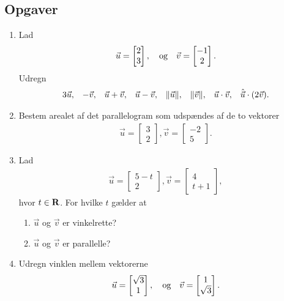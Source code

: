 \subsection{Opgaver}
\begin{enumerate}
	\item Lad 
	\begin{align*}
	\vec{u}=\begin{bmatrix}
	2\\3
	\end{bmatrix},\quad \textup{og}\quad \vec{v}=\begin{bmatrix}
	-1\\2
	\end{bmatrix}.
	\end{align*}
	Udregn
	\begin{align*}
	3\vec{u},&&-\vec{v},&&\vec{u}+\vec{v},&&\vec{u}-\vec{v},&&\Vert \vec{u}\Vert,&&\Vert \vec{v}\Vert,&&\vec{u}\cdot \vec{v},&& \hat{\vec{u}}\cdot (2\vec{v}).
	\end{align*}
	
	\item Bestem arealet af det parallelogram som udspændes af de to vektorer
	\begin{align*}
	\vec{u}=\begin{bmatrix}
	3\\2
	\end{bmatrix},
	\vec{v}=\begin{bmatrix}
	-2\\5
	\end{bmatrix}.
	\end{align*}
	
	\item Lad 
	\begin{align*}
	\vec{u}=\begin{bmatrix}
	5-t\\ 2
	\end{bmatrix},
	\vec{v}=\begin{bmatrix}
	4\\t+1
	\end{bmatrix},
	\end{align*}
	hvor $t\in \mathbf{R}$. For hvilke $t$ gælder at
	\begin{enumerate}
		\item $\vec{u}$ og $\vec{v}$ er vinkelrette?
		\item $\vec{u}$ og $\vec{v}$ er parallelle?
	\end{enumerate}
	
	\item Udregn vinklen mellem vektorerne
	\begin{align*}
	\vec{u}=\begin{bmatrix}
	\sqrt{3}\\1
	\end{bmatrix},\quad \textup{og}\quad \vec{v}= \begin{bmatrix}
	1\\\sqrt{3}
	\end{bmatrix}.
	\end{align*}
	

\end{enumerate}

